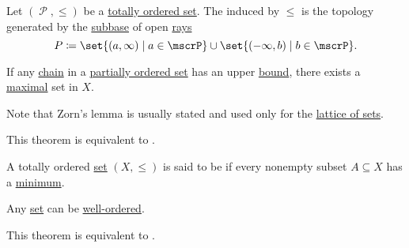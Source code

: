 \begin{definition}\label{def:order_topology}
  Let \( (\mscrP, \leq) \) be a \hyperref[def:poset]{totally ordered set}. The  induced by \( \leq \) is the topology generated by the \hyperref[def:topological_subbase]{subbase} of open \hyperref[def:total_order_interval/open_ray]{rays}
  \begin{equation*}
    P \coloneqq \set{ (a, \infty) \given a \in \mscrP } \cup \set{ (-\infty, b) \given b \in \mscrP }.
  \end{equation*}
\end{definition}

\begin{lemma}\label{thm:zorns_lemma}
  If any \hyperref[def:poset_chain]{chain} in a \hyperref[def:poset]{partially ordered set} has an upper \hyperref[def:preordered_set/upper_and_lower_bounds]{bound}, there exists a \hyperref[def:preordered_set/maximal_and_minimal_element]{maximal} set in \( X \).

  Note that Zorn's lemma is usually stated and used only for the \hyperref[thm:subsets_form_boolean_algebra]{lattice of sets}.

  This theorem is equivalent to .
\end{lemma}

\begin{definition}\label{def:well_ordered_set}
  A totally ordered \hyperref[def:totally_ordered_set]{set} \( (X, \leq) \) is said to be  if every nonempty subset \( A \subseteq X \) has a \hyperref[def:preordered_set/maximum_and_minimum]{minimum}.
\end{definition}

\begin{theorem}\label{thm:well_ordering_principle}
  Any \hyperref[def:set_zfc]{set} can be \hyperref[def:well_ordered_set]{well-ordered}.

  This theorem is equivalent to .
\end{theorem}
